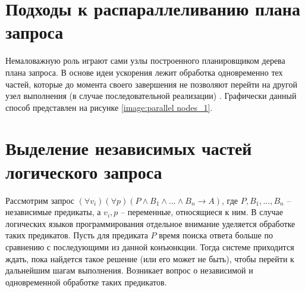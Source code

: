 \section{Подходы к распараллеливанию плана запроса}
\vspace{-0.5cm}
Немаловажную роль играют сами узлы построенного планировщиком дерева плана запроса. В основе идеи ускорения лежит обработка одновременно тех частей, которые до момента своего завершения не позволяют перейти на другой узел выполнения (в случае последовательной реализации) \cite{parallel_nodes_1}. Графически данный способ представлен на рисунке \ref{image:parallel nodes_1}.
\begin{figure}[H]
\end{figure}

\vspace{-0.5cm}
\section{Выделение независимых частей логического запроса}
\vspace{-0.5cm}
Рассмотрим запрос $(\forall v_i)(\forall p)(P \land B_1\land...\land B_n \rightarrow A)$, где 
\newline $P, B_1,...,B_n$ -- независимые предикаты, а $v_i, p$ -- переменные, относящиеся к ним. В случае логических языков программирования отдельное внимание уделяется обработке таких предикатов. Пусть для предиката $P$ время поиска ответа больше по сравнению с последующими из данной конъюнкции. Тогда системе приходится ждать, пока найдется такое решение (или его может не быть), чтобы перейти к дальнейшим шагам выполнения. Возникает вопрос о независимой и одновременной обработке таких предикатов.

